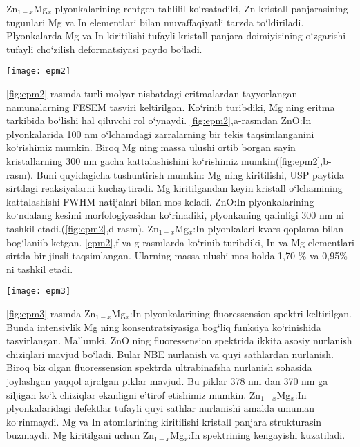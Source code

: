 \documentclass[14pt]{scrarticle}
\begin{document}
	Zn$_{1-x}$Mg$_{x}$ plyonkalarining rentgen tahlilil ko`rsatadiki, Zn kristall panjarasining tugunlari Mg va In elementlari bilan muvaffaqiyatli tarzda to`ldiriladi. Plyonkalarda Mg va In kiritilishi tufayli kristall panjara doimiyisining o`zgarishi tufayli cho`zilish deformatsiyasi paydo bo`ladi. 
	
	
	
\begin{figure*}[h]
	\centering
	\texttt{[image: epm2]}
	\caption{Mg ning turli konsentratsiyalarida Zn$_{1-x}$Mg$_{x}$ plyonkalarining FESEM da olingan tasviri: a) x=0,\  b) x=0,05, \ c) x=0,10,\  d) x=0,10, \ e)  namunalarning ko`ndalang kesimi morfologiyasi, x=0,15 da In va Mg elemantlarining taqsimoti (mos holda f va g)}
	\label{fig:epm2}
\end{figure*}


\ref{fig:epm2}-rasmda turli molyar nisbatdagi eritmalardan tayyorlangan namunalarning FESEM tasviri keltirilgan. Ko`rinib turibdiki, Mg ning eritma tarkibida bo`lishi hal qiluvchi rol o`ynaydi. 
\ref{fig:epm2},a-rasmdan ZnO:In plyonkalarida 100 nm o`lchamdagi zarralarning bir tekis taqsimlanganini ko`rishimiz mumkin. Biroq Mg ning massa ulushi ortib borgan sayin kristallarning 300 nm gacha kattalashishini ko`rishimiz mumkin(\ref{fig:epm2},b-rasm). 
Buni quyidagicha tushuntirish mumkin: Mg ning kiritilishi, USP paytida sirtdagi reaksiyalarni kuchaytiradi. Mg kiritilgandan keyin kristall o`lchamining kattalashishi FWHM natijalari bilan mos keladi. ZnO:In plyonkalarining ko`ndalang kesimi morfologiyasidan ko`rinadiki, plyonkaning qalinligi 300 nm ni tashkil etadi.(\ref{fig:epm2},d-rasm). Zn$_{1-x}$Mg$_{x}$:In plyonkalari kvars qoplama bilan bog`laniib ketgan. \ref{epm2},f va g-rasmlarda ko`rinib turibdiki, In va Mg elementlari sirtda bir jinsli taqsimlangan. Ularning massa ulushi mos holda 1,70 \% va 0,95\% ni tashkil etadi. 
	
\begin{figure*}[h]
	\centering
	\texttt{[image: epm3]}
	\caption{Zn$_{1-x}$Mg$_{x}$:In plyonkalarining fotolyuminessension spektri}
	\label{fig:epm3}
\end{figure*}
	\ref{fig:epm3}-rasmda Zn$_{1-x}$Mg$_{x}$:In plyonkalarining fluoressension spektri keltirilgan. Bunda intensivlik Mg ning konsentratsiyasiga bog`liq funksiya ko`rinishida tasvirlangan. Ma'lumki, ZnO ning fluoressension spektrida ikkita asosiy nurlanish chiziqlari mavjud bo`ladi. Bular NBE nurlanish va quyi sathlardan nurlanish. Biroq biz olgan fluoressension spektrda ultrabinafsha nurlanish sohasida joylashgan yaqqol ajralgan piklar mavjud. Bu piklar 378 nm dan 370 nm ga siljigan ko`k chiziqlar ekanligni e'tirof etishimiz mumkin. Zn$_{1-x}$Mg$_{x}$:In plyonkalaridagi defektlar tufayli quyi sathlar nurlanishi amalda umuman ko`rinmaydi. Mg va In atomlarining kiritilishi kristall panjara strukturasin buzmaydi. Mg kiritilgani uchun Zn$_{1-x}$Mg$_{x}$:In spektrining kengayishi kuzatiladi.
	
\end{document}
